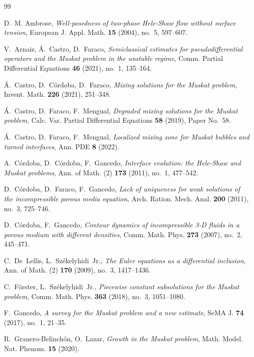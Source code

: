 \begin{thebibliography}{99}

D.~M. Ambrose, \emph{Well-posedness of two-phase Hele-Shaw flow without surface tension}, European J. Appl. Math. \textbf{15} (2004), no.~5, 597--607.

V.~Arnaiz, \'A.~Castro, D.~Faraco, \emph{Semiclassical estimates for pseudodifferential operators and the Muskat problem in the unstable regime},
Comm. Partial Differential Equations \textbf{46} (2021), no.~1, 135--164.

\'A.~Castro, D.~C\'ordoba, D.~Faraco, \emph{Mixing solutions for the Muskat problem}, Invent. Math. \textbf{226} (2021), 251--348.

\'A.~Castro, D.~Faraco, F.~Mengual, \emph{Degraded mixing solutions for the Muskat problem}, Calc. Var. Partial Differential Equations \textbf{58} (2019), Paper No.~58.

\'A.~Castro, D.~Faraco, F.~Mengual, \emph{Localized mixing zone for Muskat bubbles and turned interfaces}, Ann. PDE \textbf{8} (2022).

A.~C\'ordoba, D.~C\'ordoba, F.~Gancedo, \emph{Interface evolution: the Hele-Shaw and Muskat problems}, Ann. of Math. (2) \textbf{173} (2011), no.~1, 477--542.

D.~C\'ordoba, D.~Faraco, F.~Gancedo, \emph{Lack of uniqueness for weak solutions of the incompressible porous media equation}, Arch. Ration. Mech. Anal. \textbf{200} (2011), no.~3, 725--746.

D.~C\'ordoba, F.~Gancedo, \emph{Contour dynamics of incompressible 3-D fluids in a porous medium with different densities}, Comm. Math. Phys. \textbf{273} (2007), no.~2, 445--471.

C.~De~Lellis, L.~Sz\'ekelyhidi~Jr., \emph{The Euler equations as a differential inclusion}, Ann. of Math. (2) \textbf{170} (2009), no.~3, 1417--1436.

C.~F\"orster, L.~Sz\'ekelyhidi~Jr., \emph{Piecewise constant subsolutions for the Muskat problem}, Comm. Math. Phys. \textbf{363} (2018), no.~3, 1051--1080.

F.~Gancedo, \emph{A survey for the Muskat problem and a new estimate}, SeMA J. \textbf{74} (2017), no.~1, 21--35.

R.~Granero-Belinch\'on, O.~Lazar, \emph{Growth in the Muskat problem}, Math. Model. Nat. Phenom. \textbf{15} (2020).


\end{thebibliography}

